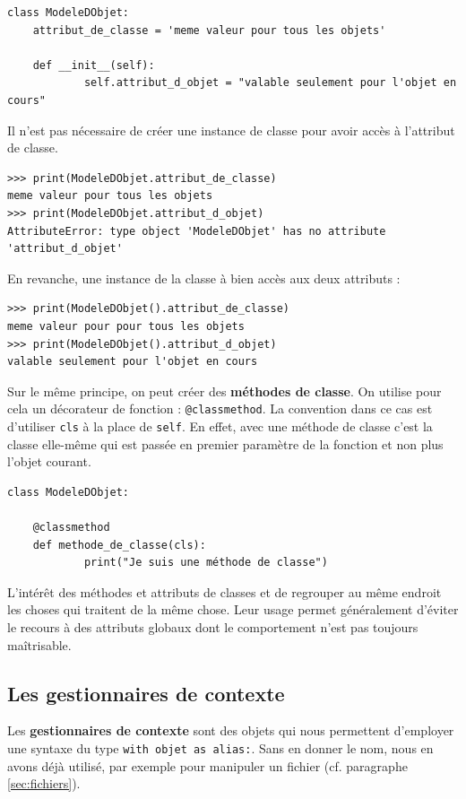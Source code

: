 \documentclass[12pt, a4paper]{article}
\begin{document}
\begin{lstlisting}
class ModeleDObjet:
    attribut_de_classe = 'meme valeur pour tous les objets'

    def __init__(self):
		    self.attribut_d_objet = "valable seulement pour l'objet en cours"
\end{lstlisting}

Il n'est pas nécessaire de créer une instance de classe pour avoir accès à l'attribut de classe.
\begin{lstlisting}
>>> print(ModeleDObjet.attribut_de_classe)
meme valeur pour tous les objets
>>> print(ModeleDObjet.attribut_d_objet)
AttributeError: type object 'ModeleDObjet' has no attribute 'attribut_d_objet'
\end{lstlisting}

En revanche, une instance de la classe à bien accès aux deux attributs :
\begin{lstlisting}
>>> print(ModeleDObjet().attribut_de_classe)
meme valeur pour pour tous les objets
>>> print(ModeleDObjet().attribut_d_objet)
valable seulement pour l'objet en cours
\end{lstlisting}

Sur le même principe, on peut créer des \textbf{méthodes de classe}. On utilise pour cela un décorateur de fonction : \lstinline{@classmethod}. La convention dans ce cas est d'utiliser \lstinline{cls} à la place de \lstinline{self}. En effet, avec une méthode de classe c'est la classe elle-même qui est passée en premier paramètre de la fonction et non plus l'objet courant.
\begin{lstlisting}
class ModeleDObjet:
    
    @classmethod
    def methode_de_classe(cls):
		    print("Je suis une méthode de classe")
\end{lstlisting}

L'intérêt des méthodes et attributs de classes et de regrouper au même endroit les choses qui traitent de la même chose. Leur usage permet généralement d'éviter le recours à des attributs globaux dont le comportement n'est pas toujours maîtrisable.


\subsection{Les gestionnaires de contexte}
Les \textbf{gestionnaires de contexte} sont des objets qui nous permettent d'employer une syntaxe du type \lstinline{with objet as alias:}. Sans en donner le nom, nous en avons déjà utilisé, par exemple pour manipuler un fichier (cf. paragraphe \ref{sec:fichiers}).
\end{document}
